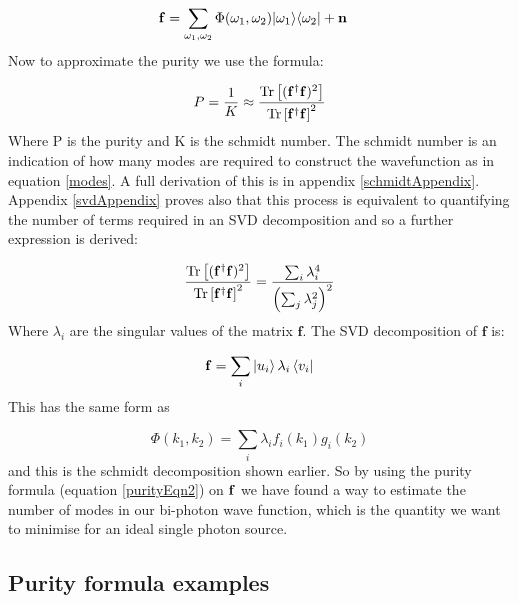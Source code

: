 \begin{align}
{\bf f}&=\sum_{\omega_1,\omega_2}\Phi(\omega_1,\omega_2)|\omega_1\rangle\langle\omega_2| + {\bf n }
\end{align}
\noindent
Now to approximate the purity we use the formula:

\begin{equation} \label{purityEqn2}
P = \frac{1}{K}\approx\frac{\operatorname{Tr}\left [({\bf f}^{\dagger}{\bf f})^2 \right ]}{\operatorname{Tr}\left [{\bf f}^{\dagger}{\bf f} \right ]^2}
\end{equation}
\noindent
Where P is the purity and K is the schmidt number. The schmidt number is an indication of how many modes are required to construct the wavefunction as in equation \ref{modes}. A full derivation of this is in appendix \ref{schmidtAppendix}. Appendix \ref{svdAppendix} proves also that this process is equivalent to quantifying the number of terms required in an SVD decomposition and so a further expression is derived:

\begin{align}
\frac{\operatorname{Tr}\left [({\bf f}^{\dagger}{\bf f})^2 \right ]}{\operatorname{Tr}\left [{\bf f}^{\dagger}{\bf f} \right ]^2}=\frac{\sum_{i}\lambda^4_i}{\left ( \sum_{j}\lambda^2_j \right )^2}
\end{align}
\noindent
Where $\lambda_i$ are the singular values of the matrix $\mathbf{f}$. The SVD decomposition of $\mathbf{f}$ is:

\begin{equation}
 {\bf f} = \sum_i \ket{u_i} \lambda_i \bra{v_i}
\end{equation}
\noindent
This has the same form as

\begin{equation} \label{modes2}
	\Phi(k_1,k_2) = \sum_i \lambda_if_i(k_1)g_i(k_2)
\end{equation}
\noindent
and this is the schmidt decomposition shown earlier. So by using the purity formula (equation \ref{purityEqn2}) on ${\bf f }$ we have found a way to estimate the number of modes in our bi-photon wave function, which is the quantity we want to minimise for an ideal single photon source.

\subsection{Purity formula examples}

